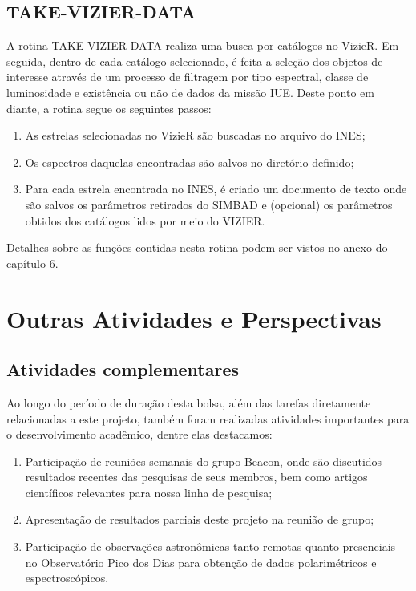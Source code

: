 \documentclass[letterpaper,10pt,english]{sphinxmanual}
\begin{document}
\section{TAKE-VIZIER-DATA}
\label{index:take-vizier-data}
A rotina TAKE-VIZIER-DATA realiza uma busca por catálogos no VizieR. Em seguida, dentro de cada catálogo selecionado, é feita a seleção dos objetos de interesse através de um processo de filtragem por tipo espectral, classe de luminosidade e existência ou não de dados da missão IUE. Deste ponto em diante, a rotina segue os seguintes passos:
\begin{enumerate}
\item {} 
As estrelas selecionadas no VizieR são buscadas no arquivo do INES;

\item {} 
Os espectros daquelas encontradas são salvos no diretório definido;

\item {} 
Para cada estrela encontrada no INES, é criado um documento de texto onde são salvos os parâmetros retirados do SIMBAD e (opcional) os parâmetros obtidos dos catálogos lidos por meio do VIZIER.

\end{enumerate}

Detalhes sobre as funções contidas nesta rotina podem ser vistos no anexo do capítulo 6.


\chapter{Outras Atividades e Perspectivas}
\label{index:outras-atividades-e-perspectivas}

\section{Atividades complementares}
\label{index:atividades-complementares}
Ao longo do período de duração desta bolsa, além das tarefas diretamente relacionadas a este projeto, também foram realizadas atividades importantes para o desenvolvimento acadêmico, dentre elas destacamos:
\begin{enumerate}
\item {} 
Participação de reuniões semanais do grupo Beacon, onde são discutidos resultados recentes das pesquisas de seus membros, bem como artigos científicos relevantes para nossa linha de pesquisa;

\item {} 
Apresentação de resultados parciais deste projeto na reunião de grupo;

\item {} 
Participação de observações astronômicas tanto remotas quanto presenciais no Observatório Pico dos Dias para obtenção de dados polarimétricos e espectroscópicos.

\end{enumerate}
\end{document}
